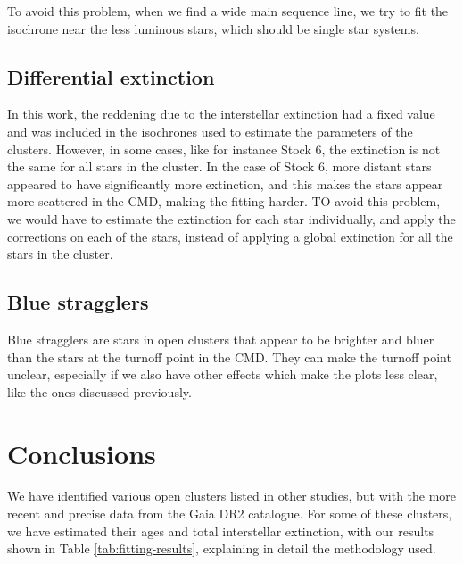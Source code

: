 \documentclass[twocolumn]{revtex4}
\begin{document}
To avoid this problem, when we find a wide main sequence line, we try to fit the isochrone near the less luminous stars, which should be single star systems.

\subsection{Differential extinction}
In this work, the reddening due to the interstellar extinction had a fixed value and was included in the isochrones used to estimate the parameters of the clusters. However, in some cases, like for instance Stock 6, the extinction is not the same for all stars in the cluster. In the case of Stock 6, more distant stars appeared to have significantly more extinction, and this makes the stars appear more scattered in the CMD, making the fitting harder. TO avoid this problem, we would have to estimate the extinction for each star individually, and apply the corrections on each of the stars, instead of applying a global extinction for all the stars in the cluster.

\subsection{Blue stragglers}
Blue stragglers are stars in open clusters that appear to be brighter and bluer than the stars at the turnoff point in the CMD. They can make the turnoff point unclear, especially if we also have other effects which make the plots less clear, like the ones discussed previously.

\section{Conclusions}
We have identified various open clusters listed in other studies, but with the more recent and precise data from the Gaia DR2 catalogue. For some of these clusters, we have estimated their ages and total interstellar extinction, with our results shown in Table \ref{tab:fitting-results}, explaining in detail the methodology used.
\end{document}
